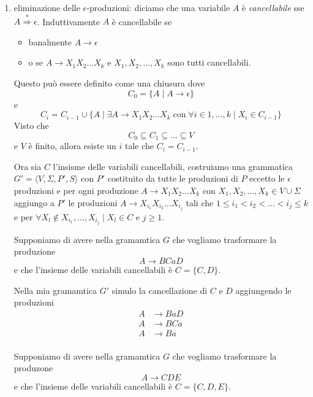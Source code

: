 \documentclass[12pt]{report}
\begin{document}
\begin{enumerate}
	\item eliminazione delle $\epsilon$-produzioni: diciamo che una variabile $A$ è \textit{cancellabile} sse $A \overset{*}{\Rightarrow} \epsilon$.
		Induttivamente $A$ è cancellabile se
		\begin{itemize}
			\item banalmente $A \rightarrow \epsilon$
			\item o se $A \rightarrow X_1 X_2 \dots X_k$ e $X_1, X_2, \dots, X_k$ sono tutti cancellabili.
		\end{itemize}
		Questo può essere definito come una chiusura dove
		$$ C_0 = \{ A \mid A \rightarrow \epsilon \} $$
		e 
		$$ C_i = C_{i - 1} \cup \{ A \mid \exists A \rightarrow X_1 X_2 \dots X_k \; \text{con} \; \forall i \in 1, \dots, k \mid X_i \in C_{i - 1} \} $$
		Visto che
		$$ C_0 \subseteq C_1 \subseteq \dots \subseteq V $$
		e $V$ è finito, allora esiste un $i$ tale che $C_i = C_{i - 1}$.

		Ora sia $C$ l'insisme delle variabili cancellabili, costruiamo una grammatica $G' = \langle V, \Sigma, P', S \rangle$ con $P'$ costituito da tutte le produzioni di $P$ eccetto le $\epsilon$ produzioni e per ogni produzione $A \rightarrow X_1 X_2 \dots X_k$ con $X_1, X_2, \dots, X_k \in V \cup \Sigma$ aggiungo a $P'$ le produzioni $A \rightarrow X_{i_1} X_{i_2} \dots X_{i_j}$ tali che $1 \leq i_1 < i_2 < \dots < i_j \leq k$ e per $\forall X_l \not \in X_{i_1}, \dots, X_{i_j} \mid X_l \in C$ e $j \geq 1$.

		\begin{tcolorbox}
			Supponiamo di avere nella gramamtica $G$ che vogliamo trasformare la produzione
			$$ A \rightarrow B C a D $$
			e che l'insieme delle variabili cancellabili è $C = \{C, D\}$.

			Nella mia gramamtica $G'$ simulo la cancellazione di $C$ e $D$ aggiungendo le produzioni
			\begin{align*}
				A &\rightarrow B a D \\
				A &\rightarrow B C a \\
				A &\rightarrow B a \\
			\end{align*}
		\end{tcolorbox}

		\begin{tcolorbox}
			Supponiamo di avere nella gramamtica $G$ che vogliamo trasformare la produzone
			$$ A \rightarrow C D E $$
			e che l'insieme delle variabili cancellabili è $C = \{C, D, E\}$.


\end{tcolorbox}
\end{enumerate}
\end{document}
